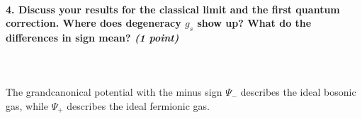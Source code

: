 \paragraph{4. Discuss your results for the classical limit and 
    the first quantum correction. Where does degeneracy $g_s$
    show up? What do the differences in sign mean?
    \textit{(1 point)}
} \ \\
    \\
    The grandcanonical potential with the minus sign 
    $\Psi_-$ describes the ideal bosonic gas, while 
    $\Psi_+$ describes the ideal fermionic gas.
